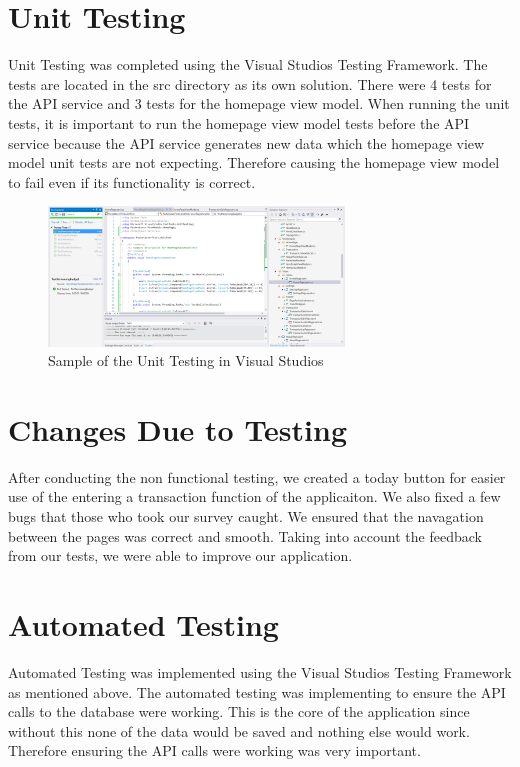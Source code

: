 \documentclass[12pt, titlepage]{article}
\begin{document}
\section{Unit Testing}
Unit Testing was completed using the Visual Studios Testing Framework. The tests are located in the src directory as its own solution. There were 4 tests for the API service and 3 tests for the homepage view model. When running the unit tests, it is important to run the homepage view model tests before the API service because the API service generates new data which the homepage view model unit tests are not expecting. Therefore causing the homepage view model to fail even if its functionality is correct.
\begin{figure}[ht]
\centering
\includegraphics[width=0.7\textwidth]{UnitTesting.png}
\caption{Sample of the Unit Testing in Visual Studios}
\end{figure}

\section{Changes Due to Testing}
After conducting the non functional testing, we created a today button for easier use of the entering a transaction function of the applicaiton. We also fixed a few bugs that those who took our survey caught. We ensured that the navagation between the pages was correct and smooth. Taking into account the feedback from our tests, we were able to improve our application.

\section{Automated Testing}
Automated Testing was implemented using the Visual Studios Testing Framework as mentioned above. The automated testing was implementing to ensure the API calls to the database were working. This is the core of the application since without this none of the data would be saved and nothing else would work. Therefore ensuring the API calls were working was very important.
\end{document}
